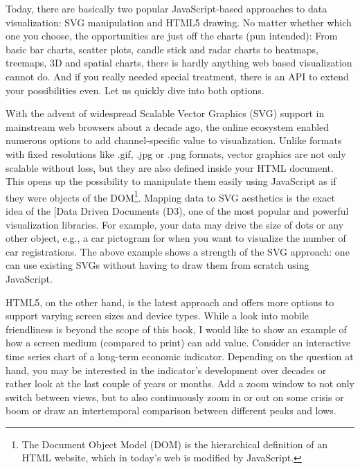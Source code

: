\documentclass[
  12pt,
  letterpaper,
]{krantz}
\begin{document}
Today, there are basically two popular JavaScript-based approaches to
data visualization: SVG manipulation and HTML5 drawing. No
matter whether which one you choose, the opportunities are just off the
charts (pun intended): From basic bar charts, scatter plots, candle
stick and radar charts to heatmaps, treemaps, 3D and spatial charts,
there is hardly anything web based visualization cannot do. And if you
really needed special treatment, there is an API to extend your
possibilities even. Let us quickly dive into both options.

With the advent of widespread Scalable Vector Graphics (SVG)
support in mainstream web browsers about a decade ago, the online
ecosystem enabled numerous options to add channel-specific value to
visualization. Unlike formats with fixed resolutions like .gif, .jpg or
.png formats, vector graphics are not only scalable without loss, but
they are also defined inside your HTML document. This opens up the
possibility to manipulate them easily using JavaScript as if they were
objects of the DOM\footnote{The Document Object Model (DOM) is the
  hierarchical definition of an HTML website, which in today's web is
  modified by JavaScript.}. Mapping data to SVG aesthetics is the exact
idea of the {[}Data Driven Documents (D3), one of the most
popular and powerful visualization libraries. For example, your data may
drive the size of dots or any other object, e.g., a car pictogram for
when you want to visualize the number of car registrations. The above
example shows a strength of the SVG approach: one can use existing SVGs
without having to draw them from scratch using JavaScript.

HTML5, on the other hand, is the latest approach and offers more options
to support varying screen sizes and device types. While a look into
mobile friendliness is beyond the scope of this book, I would like to
show an example of how a screen medium (compared to print) can add
value. Consider an interactive time series chart of a
long-term economic indicator. Depending on the question at hand, you may
be interested in the indicator's development over decades or rather look
at the last couple of years or months. Add a zoom window to not only
switch between views, but to also continuously zoom in or out on some
crisis or boom or draw an intertemporal comparison between different
peaks and lows.
\end{document}
